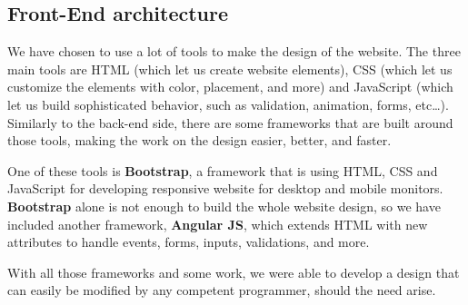\subsection{Front-End architecture}

We have chosen to use a lot of tools to make the design of the website. The
three main tools are HTML (which let us create website elements), CSS (which
let us customize the elements with color, placement, and more) and JavaScript
(which let us build sophisticated behavior, such as validation, animation,
forms, etc\ldots{}). Similarly to the back-end side, there are some frameworks
that are built around those tools, making the work on the design easier, better,
and faster. \newline

One of these tools is \textbf{Bootstrap}, a framework that is using HTML, CSS
and JavaScript for developing responsive website for desktop and mobile
monitors. \textbf{Bootstrap} alone is not enough to build the whole website
design, so we have included another framework, \textbf{Angular JS}, which
extends HTML with new attributes to handle events, forms, inputs, validations,
and more.\newline

With all those frameworks and some work, we were able to develop a design that
can easily be modified by any competent programmer, should the need arise.
